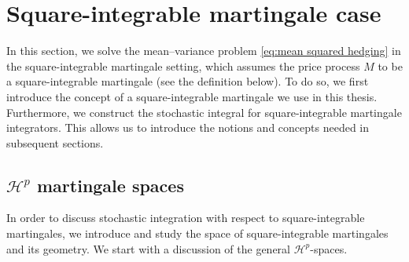 \documentclass[11pt,a4paper,twoside,openany]{report}
\numberwithin{equation}{section}
\theoremstyle{plain} %
\theoremstyle{definition} %
\theoremstyle{remark} %
\begin{document}
\section{Square-integrable martingale case}
In this section, we solve the mean--variance problem \eqref{eq:mean squared hedging} in the square-integrable martingale setting, which assumes the price process \(M\) to be a square-integrable martingale (see the definition below). To do so, we first introduce the concept of a square-integrable martingale we use in this thesis. Furthermore, we construct the stochastic integral for square-integrable martingale integrators. This allows us to introduce the notions and concepts needed in subsequent sections. 

\subsection{\(\mathcal{H}^p\) martingale spaces}
In order to discuss stochastic integration with respect to square-integrable martingales, we introduce and study the space of square-integrable martingales and its geometry. We start with a discussion of the general \(\mathcal{H}^p\)-spaces.
 
\end{document}
